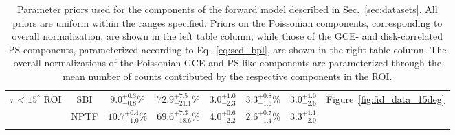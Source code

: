 \documentclass[prd,aps,10pt,nofootinbib,twocolumn,superscriptaddress,preprintnumbers,balancelastpage,longbibliography]{revtex4-1}
\newcommand\Tstrut{\rule{0pt}{2.6ex}}         %
\newcommand\Bstrut{\rule[-0.9ex]{0pt}{0pt}}   %
\begin{document}
\begin{table}[tb]
\begin{center}
\begin{tabular}{cc|cccccc}
     \hline
    \multirow{2}{*}{$r < 15^\circ$ ROI} & SBI & $9.0^{+0.3}_{-0.8}\%$ & $72.9^{+7.5}_{-21.1}\%$ & $3.0^{+1.0}_{-2.3}$ & $3.3^{+0.8}_{-1.6}\%$ & $3.0^{+1.0}_{-2.6}$
    & \multirow{2}{*}{Figure~\ref{fig:fid_data_15deg}}\Tstrut \\
     & NPTF & $10.7^{+0.4}_{-1.0}\%$ & $69.6^{+7.3}_{-18.6}\%$ & $4.0^{+0.6}_{-2.2}$ & $2.6^{+0.7}_{-1.4}\%$ & $3.3^{+1.1}_{-2.0}$\Bstrut &\\
        \botrule
    \end{tabular}
    \end{center}
    \caption{Parameter priors used for the components of the forward model described in Sec.~\ref{sec:datasets}. All priors are uniform within the ranges specified. Priors on the Poissonian components, corresponding to overall normalization, are shown in the left table column, while those of the GCE- and disk-correlated PS components, parameterized according to Eq.~\eqref{eq:scd_bpl}, are shown in the right table column. The overall normalizations of the Poissonian GCE and PS-like components are parameterized through the mean number of counts contributed by the respective components in the ROI.}
    \label{tab:results}
    \end{table}    
\end{document}
